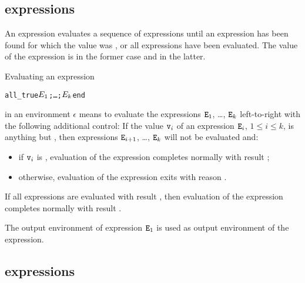 \ifStd
\subsection{ expressions}

\label{section:alltrue-exprs}

An  expression evaluates a sequence of expressions until
an expression has been found for which the value was
, or all expressions have been evaluated.  The value of
the  expression is  in the former case and
 in the latter.

\SYNTAX

\begin{rules}
\ifStd
{}
       {  }
\fi
\end{rules}

\EVALUATION

Evaluating an expression
\begin{alltt}
all_true \(\Z{E}\sb{1}\) ; \ldots ; \(\Z{E}\sb{k}\) end
\end{alltt}
in an environment $\epsilon$ means to evaluate the expressions
${\tt{\sl E}}_1$, \ldots, ${\tt{\sl E}}_k$ left-to-right with the following
additional control:
If the value ${\tt{\sl v}}_i$ of an expression ${\tt{\sl E}}_i$, $1\leq i\leq k$, is
anything but , then
expressions ${\tt{\sl E}}_{i+1}$, \ldots, ${\tt{\sl E}}_k$ will not be evaluated and:
\begin{itemize}
\item if ${\tt{\sl v}}_i$ is , evaluation of the  expression
completes normally with result ;
\item otherwise, evaluation of the  expression exits
with reason .
\end{itemize}
If all expressions are evaluated with result , then
evaluation of the  expression
completes normally with result .

\ENVIRONMENTS

The output environment of expression ${\tt{\sl E}}_1$ is used as output environment of
the  expression.

\subsection{ expressions}

